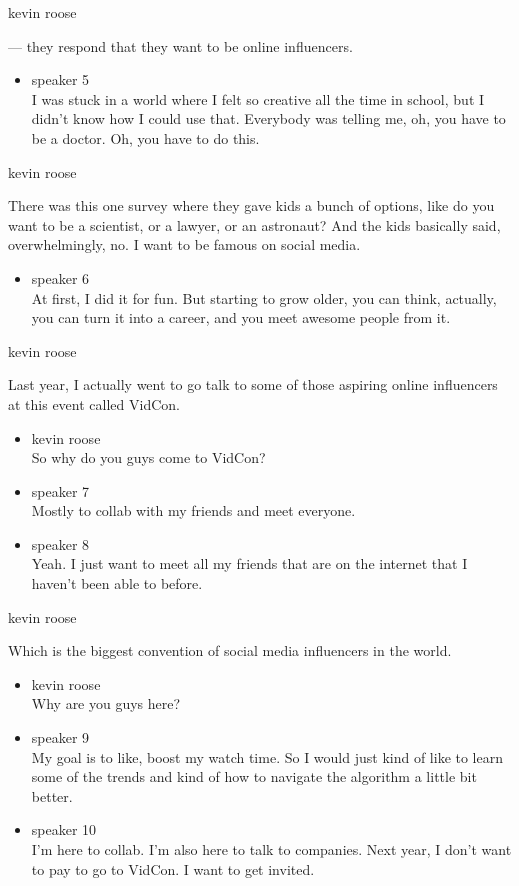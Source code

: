 kevin roose

--- they respond that they want to be online influencers.

\begin{itemize}
\tightlist
\item
  speaker 5\\
  I was stuck in a world where I felt so creative all the time in
  school, but I didn't know how I could use that. Everybody was telling
  me, oh, you have to be a doctor. Oh, you have to do this.
\end{itemize}

kevin roose

There was this one survey where they gave kids a bunch of options, like
do you want to be a scientist, or a lawyer, or an astronaut? And the
kids basically said, overwhelmingly, no. I want to be famous on social
media.

\begin{itemize}
\tightlist
\item
  speaker 6\\
  At first, I did it for fun. But starting to grow older, you can think,
  actually, you can turn it into a career, and you meet awesome people
  from it.
\end{itemize}

kevin roose

Last year, I actually went to go talk to some of those aspiring online
influencers at this event called VidCon.

\begin{itemize}
\item
  kevin roose\\
  So why do you guys come to VidCon?
\item
  speaker 7\\
  Mostly to collab with my friends and meet everyone.
\item
  speaker 8\\
  Yeah. I just want to meet all my friends that are on the internet that
  I haven't been able to before.
\end{itemize}

kevin roose

Which is the biggest convention of social media influencers in the
world.

\begin{itemize}
\item
  kevin roose\\
  Why are you guys here?
\item
  speaker 9\\
  My goal is to like, boost my watch time. So I would just kind of like
  to learn some of the trends and kind of how to navigate the algorithm
  a little bit better.
\item
  speaker 10\\
  I'm here to collab. I'm also here to talk to companies. Next year, I
  don't want to pay to go to VidCon. I want to get invited.
\end{itemize}

